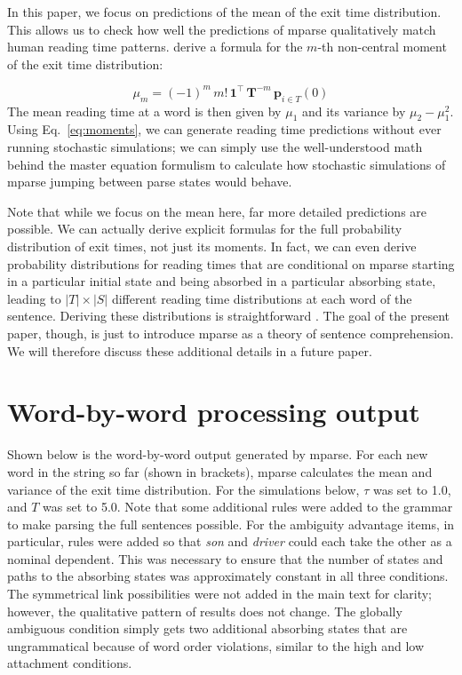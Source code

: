 \documentclass[a4paper, 12pt]{article}
\begin{document}
In this paper, we focus on predictions of the mean of the exit time
distribution. This allows us to check how well the predictions of mparse
qualitatively match human reading time patterns.
\citet{oppenheim1977stochastic} derive a formula for the $m$-th
non-central moment of the exit time distribution:

\begin{equation}\label{eq:moments}
    \mu_m = (-1)^m\, m!\, \mathbf{1}^\intercal\, \mathbf{T}^{-m}\, \mathbf{p}_{i\in
        T}(0)
\end{equation}
The mean reading time at a word is then given by $\mu_1$ and its variance by
$\mu_2 - \mu_1^2$. Using Eq.~\ref{eq:moments}, we can generate reading time
predictions without ever running stochastic simulations; we can simply use the
well-understood math behind the master equation formulism to calculate how
stochastic simulations of mparse jumping between parse states would behave.

Note that while we focus on the mean here, far more detailed predictions are
possible. We can actually derive explicit formulas for the full probability
distribution of exit times, not just its moments. In fact, we can even derive
probability distributions for reading times that are conditional on mparse
starting in a particular initial state and being absorbed in a particular
absorbing state, leading to $|T|\times |S|$ different reading time
distributions at each word of the sentence. Deriving these distributions is
straightforward \citep{iyer-biswas2016first, vankampen2007stochastic,
    polizzi2016mean}. The goal of the present paper, though, is just to
introduce mparse as a theory of sentence comprehension. We will therefore
discuss these additional details in a future paper.

\section{Word-by-word processing output}
Shown below is the word-by-word output generated by mparse. For each new word
in the string so far (shown in brackets), mparse calculates the mean and
variance of the exit time distribution. For the simulations below, $\tau$ was
set to 1.0, and $T$ was set to 5.0. Note that some additional rules were added
to the grammar to make parsing the full sentences possible. For the ambiguity
advantage items, in particular, rules were added so that \emph{son} and
\emph{driver} could each take the other as a nominal dependent. This was
necessary to ensure that the number of states and paths to the absorbing states
was approximately constant in all three conditions. The symmetrical link
possibilities were not added in the main text for clarity; however, the
qualitative pattern of results does not change. The globally ambiguous
condition simply gets two additional absorbing states that are ungrammatical
because of word order violations, similar to the high and low attachment
conditions.
\end{document}
